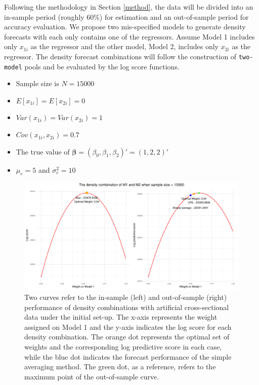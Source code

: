 \documentclass{monashthesis}
\begin{document}
Following the methodology in Section \ref{method}, the data will be divided into an in-sample period (roughly 60\%) for estimation and an out-of-sample period for accuracy evaluation. We propose two mis-specified models to generate density forecasts with each only contains one of the regressors. Assume Model 1 includes only \(x_{1i}\) as the regressor and the other model, Model 2, includes only \(x_{2i}\) as the regressor. The density forecast combinations will follow the construction of \texttt{two-model} pools and be evaluated by the log score functions.

\begin{itemize}
\item
  Sample size is \(N=15000\)
\item
  \(E[x_{1i}] = E[x_{2i}] = 0\)
\item
  \(Var(x_{1i}) = Var(x_{2i}) = 1\)
\item
  \(Cov(x_{1i}, x_{2i}) = 0.7\)
\item
  The true value of \(\pmb{\beta} = (\beta_0, \beta_1, \beta_2)' = (1,2,2)'\)
\item
  \(\mu_e = 5\) and \(\sigma^2_e=10\)
\end{itemize}

\begin{figure}[ht]
\centering
\includegraphics[scale=0.6]{figures/Sample_Size_15000.pdf}
\caption{Two curves refer to the in-sample (left) and out-of-sample (right) performance of density combinations with artificial cross-sectional data under the initial set-up. The x-axis represents the weight assigned on Model 1 and the y-axis indicates the log score for each density combination. The orange dot represents the optimal set of weights and the corresponding log predictive score in each case, while the blue dot indicates the forecast performance of the simple averaging method. The green dot, as a reference, refers to the maximum point of the out-of-sample curve.}
\label{fig:ss15000}
\end{figure}
\end{document}
